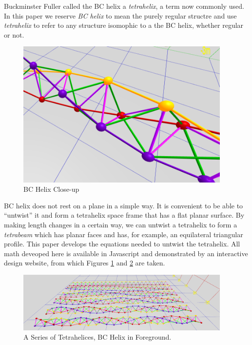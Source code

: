\documentclass[11pt]{article}
\begin{document}
Buckminster Fuller called the BC helix a \emph{tetrahelix}\cite{fuller1982synergetics},
a term now commonly used. In this paper we reserve \emph{BC helix} to mean the purely regular structre and use \emph{tetrahelix} to refer
to any structure isomophic to a the BC helix, whether regular or not.

\begin{figure}[H] %
  \label{fig:closeup}
  \centering
     \includegraphics[width=0.95\textwidth]{figures/BCHelixCloseUp.png}
     \caption{BC Helix Close-up}
\end{figure}




BC helix does not rest on a plane in a simple way. It is convenient to
be able to ``untwist'' it and form a tetrahelix space frame that has a
flat planar surface. By making length changes in a certain way, we can
untwist a tetrahelix to form a \emph{tetrabeam} which has planar faces
and has, for example, an equilateral triangular profile. This paper
develops the equations needed to untwist the tetrahelix. All math
deveoped here is available in Javascript and demonstrated by an interactive
design website\cite{readtetrahelix}, from which Figures \ref{fig:closeup} and
\ref{fig:series} are taken.

\begin{figure}[H] %
  \label{fig:series}
  \centering
     \includegraphics[width=0.95\textwidth]{figures/TetrahelixSeries.png}
     \caption{A Series of Tetrahelices, BC Helix in Foreground.}
\end{figure}
\end{document}
